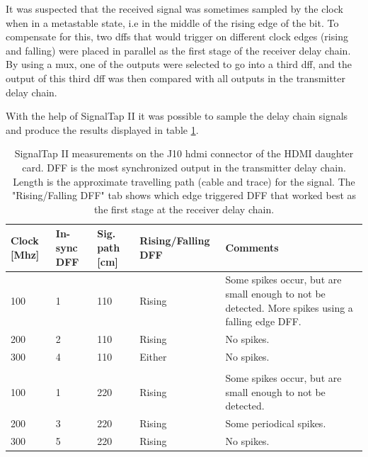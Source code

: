 \documentclass[main.tex]{subfiles}
\begin{document}

It was suspected that the received signal was sometimes sampled by the clock when in a metastable state, i.e in the middle of the rising edge of the bit. To compensate for this, two \glspl{dff} that would trigger on different clock edges (rising and falling) were placed in parallel as the first stage of the receiver delay chain. By using a mux, one of the outputs were selected to go into a third \gls{dff}, and the output of this third \gls{dff} was then compared with all outputs in the transmitter delay chain. 

With the help of SignalTap II it was possible to sample the delay chain signals and produce the results displayed in table \ref{tab:delch}. 
\begin{table}[H]
\centering
\caption{SignalTap II measurements on the J10 hdmi connector of the HDMI daughter card. DFF is the most synchronized output in the transmitter delay chain. Length is the approximate travelling path (cable and trace) for the signal. The "Rising/Falling DFF" tab shows which edge triggered DFF that worked best as the first stage at the receiver delay chain.}
\label{tab:delch}
\begin{tabular}{|l|l|l|l|p{5cm}|}
\hline
 Clock [Mhz]  & In-sync DFF   & Sig. path [cm]   & Rising/Falling DFF  & Comments \\ \hline
 100          & 1     & 110           & Rising              & Some spikes occur, but are small enough to not be detected. More spikes using a falling edge DFF.  \\ \hline
 200          & 2     & 110           & Rising              & No spikes. \\ \hline
 300          & 4     & 110           & Either              & No spikes. \\ \hline
 \multicolumn{5}{|l|}{} \\ \hline
 100          & 1     & 220           & Rising              & Some spikes occur, but are small enough to not be detected.\\ \hline
 200          & 3     & 220           & Rising              & Some periodical spikes.\\ \hline
 300          & 5     & 220           & Rising              & No spikes.\\ \hline
\end{tabular}
\end{table}
\end{document}
